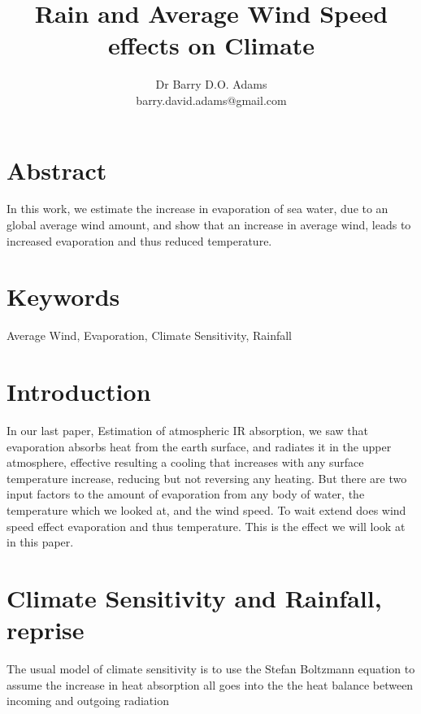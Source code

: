 \documentclass{book}
\begin{document}
	\title{Rain and Average Wind Speed effects on Climate}
	\author{Dr Barry D.O. Adams \\ barry.david.adams@gmail.com}
	\maketitle
	\section{Abstract}
		In this work, we estimate the increase in evaporation of sea water, due to an global average wind amount, and show
		that an increase in average wind, leads to increased evaporation and thus reduced temperature.
		
	\section{Keywords} Average Wind, Evaporation, Climate Sensitivity, Rainfall
	
	\section{Introduction}
		In our last paper, Estimation of atmospheric IR absorption, we saw that evaporation absorbs heat from the earth surface, and radiates it in the upper atmosphere,
		effective resulting a cooling that increases with any surface temperature increase, reducing but not reversing any heating. But there are two input factors to the
		amount of evaporation from any body of water, the temperature which we looked at, and the wind speed. To wait extend does wind speed effect evaporation and thus
		temperature. This is the effect we will look at in this paper. 
		
	\section{Climate Sensitivity and Rainfall, reprise}
	
	The usual model of climate sensitivity is to use the Stefan Boltzmann equation to assume the increase in heat absorption all goes into the the heat balance between incoming and outgoing radiation \cite{wikisense}
	
\end{document}
